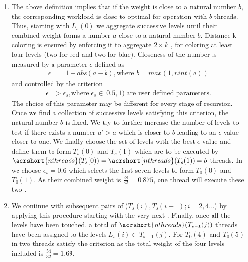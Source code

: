 \begin{enumerate}
	\item The above definition implies that if the weight is close to a natural number $b$, the corresponding workload is close to optimal for operation with $b$ threads. Thus, starting with $L_s(0)$ we aggregate successive levels until their combined weight forms a number $a$ close to a natural number $b$. Distance-k coloring is ensured by enforcing it to aggregate \atleast $2 \times k$ \levels, \ie for \DTWO coloring at least four levels (two for red and two for blue). Closeness of the number is measured by a parameter $\epsilon$ defined as
	\begin{align*}
		\epsilon &=  1 - abs(a-b), \text{where } b= max(1,nint(a))
	\end{align*}
	and controlled by the criterion
	\begin{align*}
	\epsilon &> \epsilon_s, \text{where $\epsilon_s \in  [0.5,1)$ are user defined parameters.} 	
	\end{align*}		   
	The choice of this parameter may be different for every stage of recursion. 
	 Once we find a collection of successive levels satisfying this criterion, the natural number $b$ is fixed. We try to further increase the number of levels to test if there exists a number $a'>a$ which is closer to $b$ leading to an $\epsilon$ value closer to one. We finally choose the set of levels with the best $\epsilon$ value and define them to form $T_s(0)$ and $T_s(1)$ which are to be executed by $\acrshort{nthreads}(T_s(0))=\acrshort{nthreads}(T_s(1))=b$ threads.	 
	 In  we choose $\epsilon_s = 0.6$ which selects the first seven levels to form $T_0(0)$ and $T_0(1)$.  As their combined weight is $\frac{28}{32}=0.875$,  one thread will execute these two \levelGroups. 

	\item We continue with subsequent pairs of \levelGroups ($T_s(i), T_s(i+1); i=2,4 ...$) by applying this procedure starting with the very next \level. Finally, once all the levels have been touched, a total of $\acrshort{nthreads}(T_{s-1}(j))$ threads have been assigned to the levels $L_s(i) \subset T_{s-1}(j)$. For $T_0(4)$ and $T_0(5)$  in  two threads satisfy the criterion as the total weight of the four levels included is $\frac{54}{32}=1.69$.
	

\end{enumerate}
